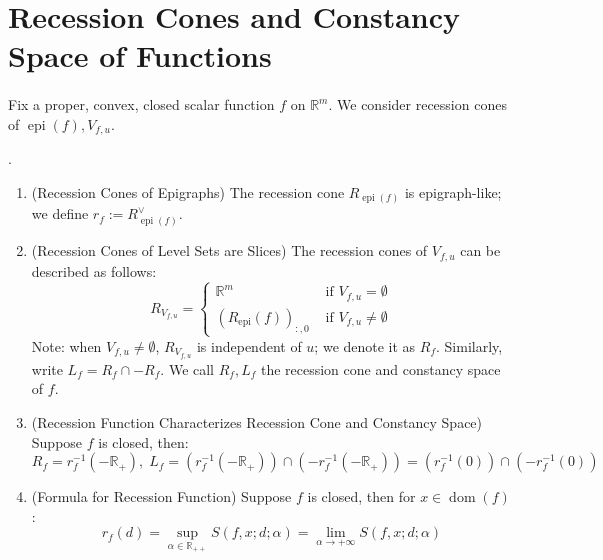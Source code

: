 \section{Recession Cones and Constancy Space of Functions}
\label{sect:024}

\paragraph{}Fix a proper, convex, closed scalar function $f$ on $\mathbb{R}^m$. We consider recession cones of $\operatorname{epi}(f),V_{f,u}$.

\begin{prop}\label{prop:024-recess-epi-level}
	.
	\begin{enumerate}[label=(\alph*)]
		\item (Recession Cones of Epigraphs) The recession cone $R_{\operatorname{epi}(f)}$ is epigraph-like; we define $r_f:=R_{\operatorname{epi}(f)}^\vee$.
		\item (Recession Cones of Level Sets are Slices) The recession cones of $V_{f,u}$ can be described as follows:
		      \[
			      R_{V_{f,u}}=\begin{cases}
				      \mathbb{R}^m                                 & \text{ if }V_{f,u}=\emptyset    \\
				      \left(R_{\operatorname{epi}}(f)\right)_{:,0} & \text{ if }V_{f,u}\neq\emptyset
			      \end{cases}
		      \]
		      Note: when $V_{f,u}\neq\emptyset$, $R_{V_{f,u}}$ is independent of $u$; we denote it as $R_f$. Similarly, write $L_{f}=R_f\cap -R_f$. We call $R_f,L_f$ the recession cone and constancy space of $f$.
		\item (Recession Function Characterizes Recession Cone and Constancy Space) Suppose $f$ is closed, then:
		      \[
			      R_f=r_f^{-1}\left(-\mathbb{R}_{+}\right),\;
			      L_f=\left(r_f^{-1}\left(-\mathbb{R}_{+}\right)\right)\cap\left(-r_f^{-1}(-\mathbb{R}_{+})\right)=\left(r_f^{-1}(0)\right)\cap\left(-r_f^{-1}(0)\right)
		      \]
		\item (Formula for Recession Function) Suppose $f$ is closed, then for $x\in \operatorname{dom}(f)$:
		      \[
			      r_f(d)=\underset{\alpha\in \mathbb{R}_{++}}{\operatorname{sup}}S(f,x; d; \alpha)
			      =\lim_{\alpha \to+\infty}S(f,x; d; \alpha)
		      \]
	\end{enumerate}
\end{prop}


